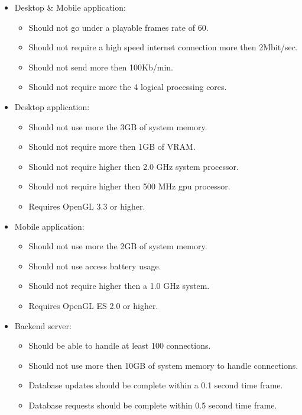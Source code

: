 \documentclass[letterpaper]{article}
\begin{document}
					\begin{itemize}
						\item Desktop \& Mobile application:
							\begin{itemize}
								\item Should not go under a playable frames rate of 60.
								\item Should not require a high speed internet connection more then 2Mbit/sec.
								\item Should not send more then 100Kb/min.
								\item Should not require more the 4 logical processing cores.
							\end{itemize}
							
						\item Desktop application:
							\begin{itemize}
								\item Should not use more the 3GB of system memory.
								\item Should not require more then 1GB of VRAM.
								\item Should not require higher then 2.0 GHz system processor.
								\item Should not require higher then 500 MHz gpu processor.
								\item Requires OpenGL 3.3 or higher.
							\end{itemize}
							
						\item Mobile application:
							\begin{itemize}
								\item Should not use more the 2GB of system memory.
								\item Should not use access battery usage.
								\item Should not require higher then a 1.0 GHz system.
								\item Requires OpenGL ES 2.0 or higher.
							\end{itemize}
							
						\item Backend server:
							\begin{itemize}
								\item Should be able to handle at least 100 connections.
								\item Should not use more then 10GB of system memory to handle connections.
								\item Database updates should be complete within a 0.1 second time frame.
								\item Database requests should be complete within 0.5 second time frame.
							\end{itemize}
					\end{itemize}
				
\end{document}
